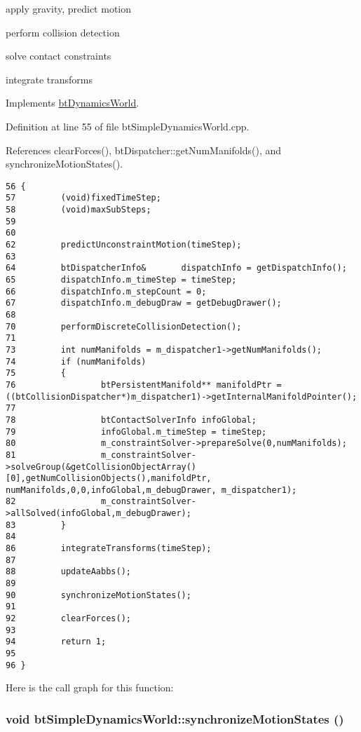 apply gravity, predict motion

perform collision detection

solve contact constraints

integrate transforms 

Implements \hyperlink{classbt_dynamics_world_5ab26a0d6e8b2b21fbde2ed8f8dd6294}{btDynamicsWorld}.

Definition at line 55 of file btSimpleDynamicsWorld.cpp.

References clearForces(), btDispatcher::getNumManifolds(), and synchronizeMotionStates().

\begin{Code}\begin{verbatim}56 {
57         (void)fixedTimeStep;
58         (void)maxSubSteps;
59 
60 
62         predictUnconstraintMotion(timeStep);
63 
64         btDispatcherInfo&       dispatchInfo = getDispatchInfo();
65         dispatchInfo.m_timeStep = timeStep;
66         dispatchInfo.m_stepCount = 0;
67         dispatchInfo.m_debugDraw = getDebugDrawer();
68 
70         performDiscreteCollisionDetection();
71 
73         int numManifolds = m_dispatcher1->getNumManifolds();
74         if (numManifolds)
75         {
76                 btPersistentManifold** manifoldPtr = ((btCollisionDispatcher*)m_dispatcher1)->getInternalManifoldPointer();
77                 
78                 btContactSolverInfo infoGlobal;
79                 infoGlobal.m_timeStep = timeStep;
80                 m_constraintSolver->prepareSolve(0,numManifolds);
81                 m_constraintSolver->solveGroup(&getCollisionObjectArray()[0],getNumCollisionObjects(),manifoldPtr, numManifolds,0,0,infoGlobal,m_debugDrawer, m_dispatcher1);
82                 m_constraintSolver->allSolved(infoGlobal,m_debugDrawer);
83         }
84 
86         integrateTransforms(timeStep);
87                 
88         updateAabbs();
89 
90         synchronizeMotionStates();
91 
92         clearForces();
93 
94         return 1;
95 
96 }
\end{verbatim}
\end{Code}




Here is the call graph for this function:\hypertarget{classbt_simple_dynamics_world_91e996f5ce6e465e805565ee0ba14824}{
\subsubsection[synchronizeMotionStates]{\setlength{\rightskip}{0pt plus 5cm}void btSimpleDynamicsWorld::synchronizeMotionStates ()}}
\label{classbt_simple_dynamics_world_91e996f5ce6e465e805565ee0ba14824}




